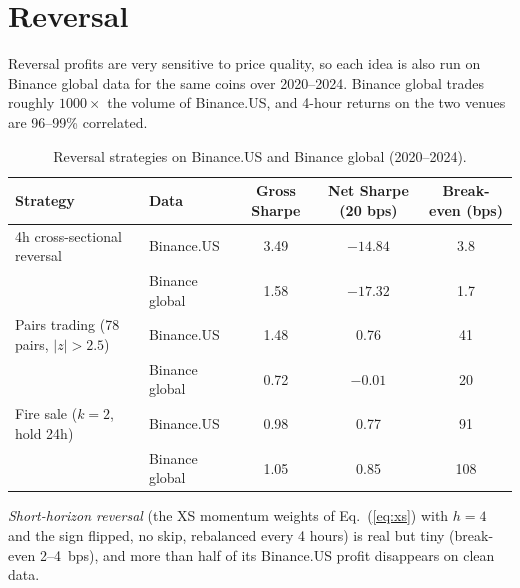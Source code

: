 \documentclass[aps,prl,onecolumn,superscriptaddress,nofootinbib]{revtex4-2}
\begin{document}
	\section{Reversal}
	\label{app:reversal}
	
	Reversal profits are very sensitive to price quality, so each idea is also run on Binance global data for the same coins over 2020--2024. Binance global trades roughly $1000\times$ the volume of Binance.US, and 4-hour returns on the two venues are 96--99\% correlated.
	
	\begin{table}[!htbp]
		\caption{Reversal strategies on Binance.US and Binance global (2020--2024).}
		\label{tab:reversal}
		\begin{ruledtabular}
			\begin{tabular}{llccc}
				Strategy & Data & Gross Sharpe & Net Sharpe (20 bps) & Break-even (bps) \\
				\hline
				4h cross-sectional reversal          & Binance.US     & 3.49 & $-14.84$ & 3.8 \\
				& Binance global & 1.58 & $-17.32$ & 1.7 \\
				Pairs trading (78 pairs, $|z| > 2.5$) & Binance.US     & 1.48 & 0.76     & 41 \\
				& Binance global & 0.72 & $-0.01$  & 20 \\
				Fire sale ($k = 2$, hold 24h)        & Binance.US     & 0.98 & 0.77     & 91 \\
				& Binance global & 1.05 & 0.85     & 108 \\
			\end{tabular}
		\end{ruledtabular}
	\end{table}
	
	\textit{Short-horizon reversal} (the XS momentum weights of Eq.~(\ref{eq:xs}) with $h = 4$ and the sign flipped, no skip, rebalanced every 4 hours) is real but tiny (break-even 2--4~bps), and more than half of its Binance.US profit disappears on clean data.
	
\end{document}
